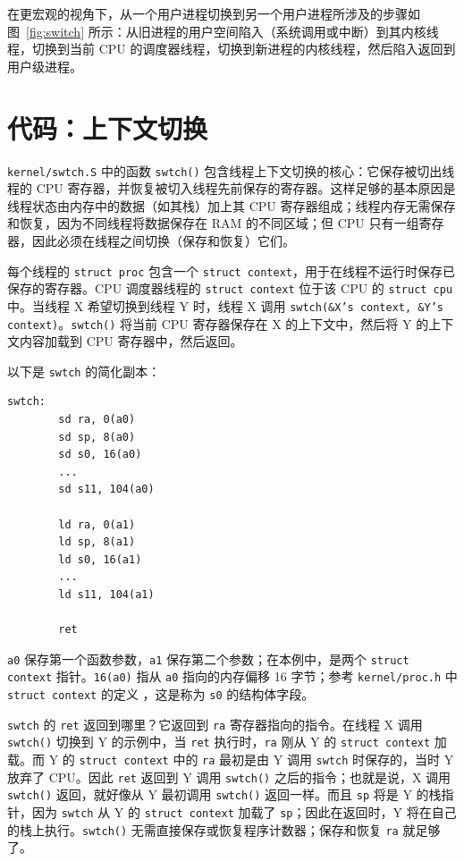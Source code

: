 在更宏观的视角下，从一个用户进程切换到另一个用户进程所涉及的步骤如图~\ref{fig:switch} 所示：从旧进程的用户空间陷入（系统调用或中断）到其内核线程，切换到当前 CPU 的调度器线程，切换到新进程的内核线程，然后陷入返回到用户级进程。


\section{代码：上下文切换}

{\tt kernel/swtch.S} 中的函数 {\tt swtch()} 包含线程上下文切换的核心：它保存被切出线程的 CPU 寄存器，并恢复被切入线程先前保存的寄存器。这样足够的基本原因是线程状态由内存中的数据（如其栈）加上其 CPU 寄存器组成；线程内存无需保存和恢复，因为不同线程将数据保存在 RAM 的不同区域；但 CPU 只有一组寄存器，因此必须在线程之间切换（保存和恢复）它们。


每个线程的 {\tt struct proc} 包含一个 {\tt struct context}，用于在线程不运行时保存已保存的寄存器。CPU 调度器线程的 {\tt struct context} 位于该 CPU 的 {\tt struct cpu} 中。当线程 X 希望切换到线程 Y 时，线程 X 调用 {\tt swtch(\&X's context, \&Y's context)}。{\tt swtch()} 将当前 CPU 寄存器保存在 X 的上下文中，然后将 Y 的上下文内容加载到 CPU 寄存器中，然后返回。

以下是 {\tt swtch} 的简化副本：

\begin{verbatim}
swtch:
        sd ra, 0(a0)
        sd sp, 8(a0)
        sd s0, 16(a0)
        ...
        sd s11, 104(a0)

        ld ra, 0(a1)
        ld sp, 8(a1)
        ld s0, 16(a1)
        ...
        ld s11, 104(a1)

        ret
\end{verbatim}

{\tt a0} 保存第一个函数参数，{\tt a1} 保存第二个参数；在本例中，是两个 {\tt struct context} 指针。{\tt 16(a0)} 指从 {\tt a0} 指向的内存偏移 16 字节；参考 {\tt kernel/proc.h} 中 {\tt struct context} 的定义 ，这是称为 {\tt s0} 的结构体字段。

{\tt swtch} 的 {\tt ret} 返回到哪里？它返回到 {\tt ra} 寄存器指向的指令。在线程 X 调用 {\tt swtch()} 切换到 Y 的示例中，当 {\tt ret} 执行时，{\tt ra} 刚从 Y 的 {\tt struct context} 加载。而 Y 的 {\tt struct context} 中的 {\tt ra} 最初是由 Y 调用 {\tt swtch} 时保存的，当时 Y 放弃了 CPU。因此 {\tt ret} 返回到 Y 调用 {\tt swtch()} 之后的指令；也就是说，X 调用 {\tt swtch()} 返回，就好像从 Y 最初调用 {\tt swtch()} 返回一样。而且 {\tt sp} 将是 Y 的栈指针，因为 {\tt swtch} 从 Y 的 {\tt struct context} 加载了 {\tt sp}；因此在返回时，Y 将在自己的栈上执行。{\tt swtch()} 无需直接保存或恢复程序计数器；保存和恢复 {\tt ra} 就足够了。

